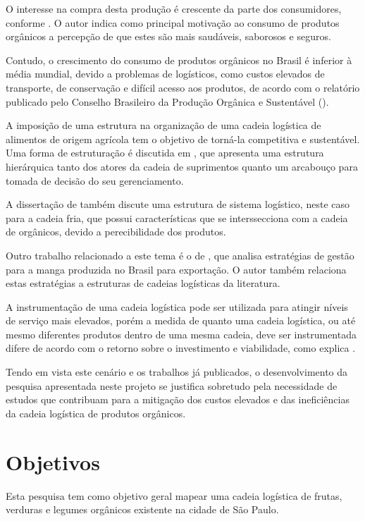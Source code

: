 \documentclass[
	12pt,				%
	openright,			%
	oneside,			%
	a4paper,			%
	english,			%
	french,				%
	spanish,			%
	brazil,				%
	]{abntex2}
\begin{document}
O interesse na compra desta produção é crescente da parte dos consumidores, conforme . O autor indica como principal motivação ao consumo de produtos orgânicos a percepção de que estes são mais saudáveis, saborosos e seguros.

Contudo, o crescimento do consumo de produtos orgânicos no Brasil é inferior à média mundial, devido a problemas de logísticos, como custos elevados de transporte, de conservação e difícil acesso aos produtos, de acordo com o relatório publicado pelo Conselho Brasileiro da Produção Orgânica e Sustentável (). 

A imposição de uma estrutura na organização de uma cadeia logística de alimentos de origem agrícola tem o objetivo de torná-la competitiva e sustentável. Uma forma de estruturação é discutida em , que apresenta uma estrutura hierárquica tanto dos atores da cadeia de suprimentos quanto um arcabouço para tomada de decisão do seu gerenciamento.

A dissertação de  também discute uma estrutura de sistema logístico, neste caso para a cadeia fria, que possui características que se interssecciona com a cadeia de orgânicos, devido a perecibilidade dos produtos. 

Outro trabalho relacionado a este tema é o de , que analisa estratégias de gestão para a manga produzida no Brasil para exportação. O autor também relaciona estas estratégias a estruturas de cadeias logísticas da literatura.

A instrumentação de uma cadeia logística pode ser utilizada para atingir níveis de serviço mais elevados, porém a medida de quanto uma cadeia logística, ou até mesmo diferentes produtos dentro de uma mesma cadeia, deve ser instrumentada difere de acordo com o retorno sobre o investimento e viabilidade, como explica .

Tendo em vista este cenário e os trabalhos já publicados, o desenvolvimento da pesquisa apresentada neste projeto se justifica sobretudo pela necessidade de estudos que contribuam para a mitigação dos custos elevados e das ineficiências da cadeia logística de produtos orgânicos.

\chapter{Objetivos}

Esta pesquisa tem como objetivo geral mapear uma cadeia logística de frutas, verduras e legumes orgânicos existente na cidade de São Paulo.
\end{document}
